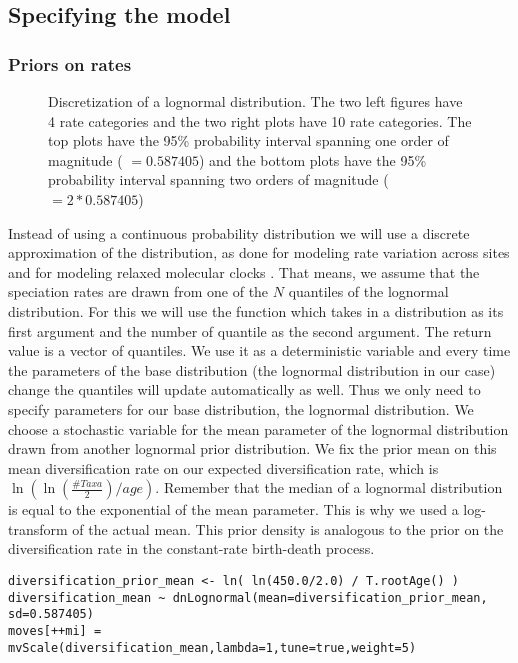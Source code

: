 \subsection{Specifying the model}

\subsubsection{Priors on rates}
\begin{figure}[htbp!]
\centering
{}
\caption{\small Discretization of a lognormal distribution. The two left figures have 4 rate categories and the two right plots have 10 rate categories. The top plots have the 95\% probability interval spanning one order of magnitude ( $=0.587405$) and the bottom plots have the 95\% probability interval spanning two orders of magnitude ( $=2*0.587405$)}
\label{fig:BSBD_likelihood}
\end{figure}
Instead of using a continuous probability distribution we will use a discrete approximation of the distribution, as done for modeling rate variation across sites \citep{Yang1994a} and for modeling relaxed molecular clocks \citep{Drummond2006}.
That means, we assume that the speciation rates are drawn from one of the $N$ quantiles of the lognormal distribution.
For this we will use the function  which takes in a distribution as its first argument and the number of quantile as the second argument.
The return value is a vector of quantiles.
We use it as a deterministic variable and every time the parameters of the base distribution (\IE the lognormal distribution in our case) change the quantiles will update automatically as well.
Thus we only need to specify parameters for our base distribution, the lognormal distribution.
We choose a stochastic variable for the mean parameter of the lognormal distribution drawn from another lognormal prior distribution.
We fix the prior mean on this mean diversification rate on our expected diversification rate, which is $\ln( \ln(\frac{\#Taxa}{2})/age )$.
Remember that the median of a lognormal distribution is equal to the exponential of the mean parameter.
This is why we used a log-transform of the actual mean.
This prior density is analogous to the prior on the diversification rate in the constant-rate birth-death process.
{\tt \begin{snugshade*}
\begin{lstlisting}
diversification_prior_mean <- ln( ln(450.0/2.0) / T.rootAge() )
diversification_mean ~ dnLognormal(mean=diversification_prior_mean, sd=0.587405)
moves[++mi] = mvScale(diversification_mean,lambda=1,tune=true,weight=5)
\end{lstlisting}
\end{snugshade*}}
